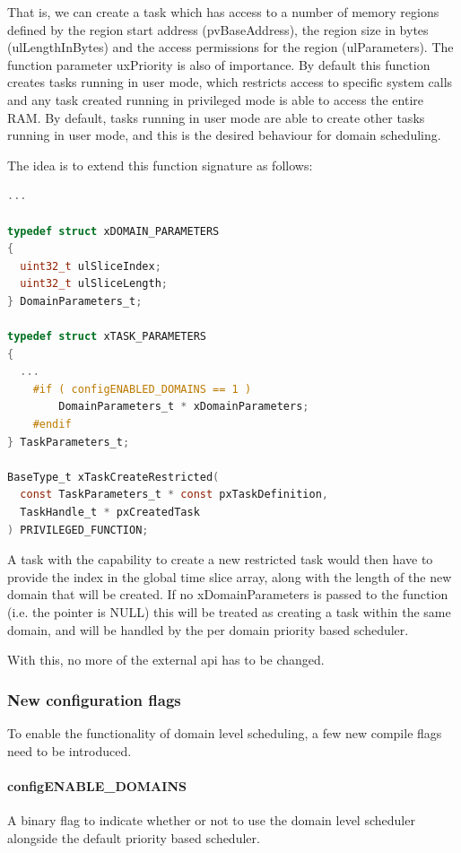 That is, we can create a task which has access to a number of memory regions
defined by the region start address (pvBaseAddress), the region size in bytes
(ulLengthInBytes) and the access permissions for the region (ulParameters). The
function parameter uxPriority is also of importance. By default this function
creates tasks running in user mode, which restricts access to specific system
calls and any task created running in privileged mode is able to access the
entire RAM. By default, tasks running in user mode are able to create other
tasks running in user mode, and this is the desired behaviour for domain
scheduling.

The idea is to extend this function signature as follows:

\begin{lstlisting}[language={c}, caption={Extended parameters and signature}, label={lst:extended_create_restricted}]
...

typedef struct xDOMAIN_PARAMETERS
{
  uint32_t ulSliceIndex;
  uint32_t ulSliceLength;
} DomainParameters_t;

typedef struct xTASK_PARAMETERS
{
  ...
    #if ( configENABLED_DOMAINS == 1 )
        DomainParameters_t * xDomainParameters; 
    #endif
} TaskParameters_t;

BaseType_t xTaskCreateRestricted( 
  const TaskParameters_t * const pxTaskDefinition, 
  TaskHandle_t * pxCreatedTask 
) PRIVILEGED_FUNCTION;
\end{lstlisting}

A task with the capability to create a new restricted task would then have to
provide the index in the global time slice array, along with the length of the
new domain that will be created. If no xDomainParameters is passed to the
function (i.e. the pointer is NULL) this will be treated as creating a task
within the same domain, and will be handled by the per domain priority based
scheduler.

With this, no more of the external api has to be changed.

\subsubsection{New configuration flags}
To enable the functionality of domain level scheduling, a few new compile flags
need to be introduced.

\paragraph{configENABLE\_DOMAINS} A binary flag to indicate whether or not to
use the domain level scheduler alongside the default priority based scheduler.

